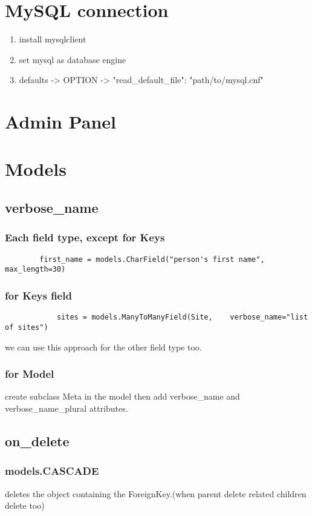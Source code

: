 \documentclass{article}
\begin{document}
	\tableofcontents
	\section{MySQL connection}
	\begin{enumerate}
		\item install mysqlclient
		\item set mysql as database engine
		\item defaults -> OPTION -> "read\_default\_file": "path/to/mysql.cnf"
	\end{enumerate}
	\section{Admin Panel}
	\section{Models}
		\subsection{verbose\_name}
		\subsubsection{Each field type, except for Keys}
		\begin{verbatim}
		first_name = models.CharField("person's first name", 	max_length=30)
		\end{verbatim}
		\subsubsection{for Keys field}
		\begin{verbatim}
			sites = models.ManyToManyField(Site, 	verbose_name="list of sites")
		\end{verbatim}
		we can use this approach for the other field type too.
		\subsubsection{for Model}
			create subclass Meta in the model then add verbose\_name and verbose\_name\_plural attributes.
		\subsection{on\_delete}
			\subsubsection{models.CASCADE}
				 deletes the object containing the ForeignKey.(when parent delete related children delete too)
			
\end{document}
